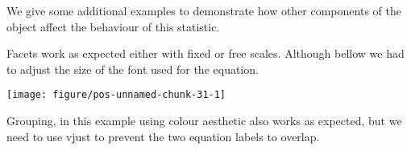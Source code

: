 \documentclass[paper=a4,10pt,div=17,headsepline,BCOR=12mm,twoside,open=right]{scrbook}\usepackage{knitr}
\begin{document}
We give some additional examples to demonstrate how other components of the 
object affect the behaviour of this statistic.

Facets work as expected either with fixed or free scales. Although bellow we
had to adjust the size of the font used for the equation.



\begin{knitrout}\footnotesize
{}\color{fgcolor}\begin{kframe}
\begin{alltt}
 \hlkwb{<-}  \hlopt{~}  \hlstd{,}  \hlstd{=} \hlstd{)}
  \hlopt{+}
  \hlstd{()} \hlopt{+}
  \hlstd{(} \hlstd{=} \hlstd{,}   \hlopt{+}
  \hlstd{(}\hlstd{(}  
                  \hlstd{=} \hlstd{)} \hlopt{+}
  \hlstd{(}\hlopt{~}
\end{alltt}
\end{kframe}

{\centering \texttt{[image: figure/pos-unnamed-chunk-31-1]} 

}



\end{knitrout}

Grouping, in this example using colour aesthetic also works as expected, but we
need to use vjust to prevent the two equation labels to overlap.
\end{document}
